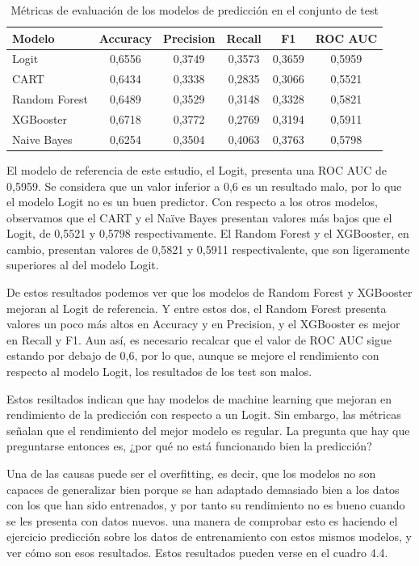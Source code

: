 \begin{table}[ht]
    \centering
    \begin{tabular}{lccccc}
    \hline
        \textbf{Modelo} & \textbf{Accuracy} & \textbf{Precision} & \textbf{Recall} & \textbf{F1} & \textbf{ROC AUC} \\ \hline
        Logit & 0,6556 & 0,3749 & 0,3573 & 0,3659 & 0,5959 \\ 
        CART & 0,6434 & 0,3338 & 0,2835 & 0,3066 & 0,5521 \\ 
        Random Forest & 0,6489 & 0,3529 & 0,3148 & 0,3328 & 0,5821 \\ 
        XGBooster & 0,6718 & 0,3772 & 0,2769 & 0,3194 & 0,5911 \\ 
        Naive Bayes & 0,6254 & 0,3504 & 0,4063 & 0,3763 & 0,5798 \\ \hline
    \end{tabular}
    \caption{Métricas de evaluación de los modelos de predicción en el conjunto de test}
\end{table}


El modelo de referencia de este estudio, el Logit, presenta una ROC AUC de 0,5959. Se considera que un valor inferior a 0,6 es un resultado malo, por lo que el modelo Logit no es un buen predictor. Con respecto a los otros modelos, observamos que el CART y el Naïve Bayes presentan valores más bajos que el Logit, de 0,5521 y 0,5798 respectivamente. El Random Forest y el XGBooster, en cambio, presentan valores de 0,5821 y 0,5911 respectivalente, que son ligeramente superiores al del modelo Logit.

De estos resultados podemos ver que los modelos de Random Forest y XGBooster mejoran al Logit de referencia. Y entre estos dos, el Random Forest presenta valores un poco más altos en Accuracy y en Precision, y el XGBooster es mejor en Recall y F1. Aun así, es necesario recalcar que el valor de ROC AUC sigue estando por debajo de 0,6, por lo que, aunque se mejore el rendimiento con respecto al modelo Logit, los resultados de los test son malos.

Estos resiltados indican que hay modelos de machine learning que mejoran en rendimiento de la predicción con respecto a un Logit. Sin embargo, las métricas señalan que el rendimiento del mejor modelo es regular. La pregunta que hay que preguntarse entonces es, ¿por qué no está funcionando bien la predicción?

Una de las causas puede ser el overfitting, es decir, que los modelos no son capaces de generalizar bien porque se han adaptado demasiado bien a los datos con los que han sido entrenados, y por tanto su rendimiento no es bueno cuando se les presenta con datos nuevos. una manera de comprobar esto es haciendo el ejercicio predicción sobre los datos de entrenamiento con estos mismos modelos, y ver cómo son esos resultados. Estos resultados pueden verse en el cuadro 4.4.

